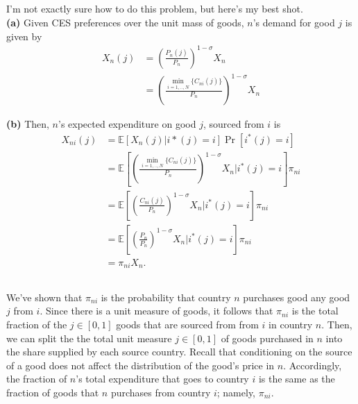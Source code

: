 \documentclass[12pt]{article}
\newcommand{\E}{\mathbb{E}}
\begin{document}
\subsection{}
I'm not exactly sure how to do this problem, but here's my best shot.\\

\textbf{(a)} Given CES preferences over the unit mass of goods, $n$'s demand for good $j$ is given by
\begin{align*}
X_n(j) &= \left(\frac{P_n(j)}{P_n}\right)^{1-\sigma}X_n\\
&=  \left(\frac{\min_{i=1,..,N}\{C_{ni}(j)\}}{P_n}\right)^{1-\sigma}X_n
\end{align*}

\textbf{(b)} Then, $n$'s expected expenditure on good $j$, sourced from $i$ is
\begin{align*}
X_{ni}(j) &= \E[X_n(j)  | i*(j) = i] \Pr[i^*(j) = i]\\
&=\E \left[\left(\frac{\min_{i=1,..,N}\{C_{ni}(j)\}}{P_n}\right)^{1-\sigma}X_n|  i^*(j) = i\right] \pi_{ni}\\
&= \E \left[\left(\frac{C_{ni}(j)}{P_n}\right)^{1-\sigma}X_n|  i^*(j) = i\right] \pi_{ni}\\
&= \E \left[\left(\frac{P_n}{P_n}\right)^{1-\sigma}X_n|  i^*(j) = i\right] \pi_{ni}\\
&= \pi_{ni} X_n.
\end{align*}




\subsection{} We've shown that $\pi_{ni}$ is the probability that country $n$ purchases good any good $j$ from $i$. Since there is a unit measure of goods, it follows that $\pi_{ni}$ is the total fraction of the $j \in [0,1]$ goods that are sourced from from $i$ in country $n$. Then, we can split the the total unit measure $j\in [0,1]$ of goods purchased in $n$ into the share supplied by each source country. Recall that conditioning on the source of a good does not affect the distribution of the good's price in $n$. Accordingly, the fraction of $n$'s total expenditure that goes to country $i$ is the same as the fraction of goods that $n$ purchases from country $i$; namely, $\pi_{ni}$.
\end{document}
